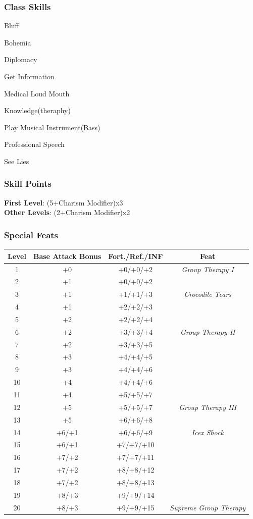 \documentclass[ letterpaper,12pt]{article}
\begin{document}
{\subsubsection{Class Skills}
\begin{itemize}
{\it
\item{Bluff}
\item{Bohemia}
\item{Diplomacy}
\item{Get Information}
\item{Medical Loud Mouth}
\item{Knowledge(theraphy)}
\item{Play Musical Instrument(Bass)}
\item{Professional Speech}
\item{See Lies}
}
\end{itemize}

\subsubsection{Skill Points}
{\bf First Level}: (5+Charism Modifier)x3\\
{\bf Other Levels}: (2+Charism Modifier)x2\\


\subsubsection{Special Feats}

\begin{center} \begin{tabular}{|c||c|c|c|}
\hline
{\bf Level}&{\bf Base Attack Bonus}&{\bf Fort./Ref./INF}&{\bf Feat}\\
\hline
1&+0&+0/+0/+2&{\it Group Therapy I}\\
\hline
2&+1&+0/+0/+2&\\
\hline
3&+1&+1/+1/+3&{\it Crocodile Tears}\\
\hline
4&+1&+2/+2/+3&\\
\hline
5&+2&+2/+2/+4&\\
\hline
6&+2&+3/+3/+4&{\it Group Therapy II}\\
\hline
7&+2&+3/+3/+5&\\
\hline
8&+3&+4/+4/+5&\\
\hline
9&+3&+4/+4/+6&\\
\hline
10&+4&+4/+4/+6&\\
\hline
11&+4&+5/+5/+7&\\
\hline
12&+5&+5/+5/+7&{\it Group Therapy III}\\
\hline
13&+5&+6/+6/+8&\\
\hline
14&+6/+1&+6/+6/+9&{\it Icex Shock}\\
\hline
15&+6/+1&+7/+7/+10&\\
\hline
16&+7/+2&+7/+7/+11&\\
\hline
17&+7/+2&+8/+8/+12&\\
\hline
18&+7/+2&+8/+8/+13&\\
\hline
19&+8/+3&+9/+9/+14&\\
\hline
20&+8/+3&+9/+9/+15&{\it Supreme Group Therapy}\\
\hline
\end{tabular} \end{center}

}
\end{document}
